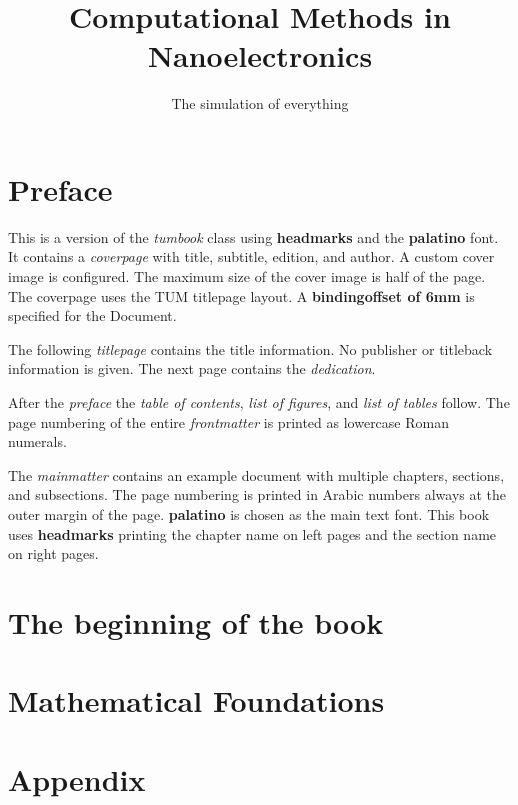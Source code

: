 \documentclass[BCOR=6mm,headmarks=true,automark,font=palatino,
  headline=oneliner,parskip=half]{tumbook}
\title{Computational Methods in Nanoelectronics}
\subtitle{The simulation of everything}
\begin{document}
\frontmatter
\maketitle

\chapter{Preface}
 {\color{TUMOrange}This is a version of the \emph{tumbook} class using
  \textbf{headmarks} and the \textbf{palatino} font.
  It contains a \emph{coverpage} with title, subtitle, edition, and author.
  A custom cover image is configured. The maximum size of the cover image is
  half of the page. The coverpage uses the TUM  titlepage layout.
  A \textbf{bindingoffset of 6mm} is specified for the Document.\par
  The following \emph{titlepage} contains the title information. No publisher
  or titleback information is given. The next page contains the
  \emph{dedication}.\par
  After the \emph{preface} the \emph{table of contents},
  \emph{list of figures}, and \emph{list of tables} follow.
  The page numbering of the entire \emph{frontmatter} is printed as
  lowercase Roman numerals.\par
  The \emph{mainmatter} contains an example document with multiple chapters,
  sections, and subsections. The page numbering is printed in Arabic numbers
  always at the outer margin of the page. \textbf{palatino} is chosen as the
  main text font. This book uses \textbf{headmarks} printing the chapter name
  on left pages and the section name on right pages.
 }

\lipsum[1-4]
\cleardoublepage

\tableofcontents
\listoffigures
\listoftables

\mainmatter
\chapter{The beginning of the book}


\chapter{Mathematical Foundations}


\appendix
\chapter{Appendix}


\backmatter


\end{document}
